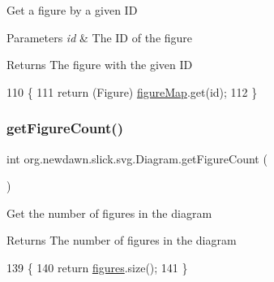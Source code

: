 Get a figure by a given ID


\begin{DoxyParams}{Parameters}
{\em id} & The ID of the figure \\
\hline
\end{DoxyParams}
\begin{DoxyReturn}{Returns}
The figure with the given ID 
\end{DoxyReturn}

\begin{DoxyCode}
110                                            \{
111         \textcolor{keywordflow}{return} (Figure) \mbox{\hyperlink{classorg_1_1newdawn_1_1slick_1_1svg_1_1_diagram_a71c079c584be2e55632123b9b2d939ad}{figureMap}}.get(\textcolor{keywordtype}{id});
112     \}
\end{DoxyCode}
\mbox{\label{classorg_1_1newdawn_1_1slick_1_1svg_1_1_diagram_a869127d837d1ffa281dc3e50817ae22e}} 
\subsubsection{\texorpdfstring{get\+Figure\+Count()}{getFigureCount()}}
{\footnotesize\ttfamily int org.\+newdawn.\+slick.\+svg.\+Diagram.\+get\+Figure\+Count (\begin{DoxyParamCaption}{ }\end{DoxyParamCaption})\hspace{0.3cm}{\ttfamily [inline]}}

Get the number of figures in the diagram

\begin{DoxyReturn}{Returns}
The number of figures in the diagram 
\end{DoxyReturn}

\begin{DoxyCode}
139                                 \{
140         \textcolor{keywordflow}{return} \mbox{\hyperlink{classorg_1_1newdawn_1_1slick_1_1svg_1_1_diagram_aaddbe68bc0b0c847583aa35d530aba2f}{figures}}.size();
141     \}
\end{DoxyCode}
\mbox{\label{classorg_1_1newdawn_1_1slick_1_1svg_1_1_diagram_a13c8069cc4608b5f12fdab9586793d64}} 
